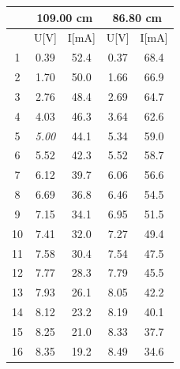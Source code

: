 \documentclass{article}
\begin{document}
{\begin{table}[H]
\centering
\begin{tabular}{@{}c|cc||cc@{}}
\toprule
\multirow{2}{*}{} & \multicolumn{2}{c||}{109.00 cm} & \multicolumn{2}{c}{86.80 cm}                \\ \midrule
                  & U[V]              & I[mA]     & U[V]                 & I[mA]                \\ \midrule
1                 & 0.39              & 52.4      & 0.37                 & 68.4                 \\
2                 & 1.70              & 50.0      & 1.66                 & 66.9                 \\
3                 & 2.76              & 48.4      & 2.69                 & 64.7                 \\
4                 & 4.03              & 46.3      & 3.64                 & 62.6                 \\
5                 & \textit{5.00}     & 44.1      & 5.34                 & 59.0                 \\
6                 & 5.52              & 42.3      & 5.52                 & 58.7                 \\
7                 & 6.12              & 39.7      & 6.06                 & 56.6                 \\
8                 & 6.69              & 36.8      & 6.46                 & 54.5                 \\
9                 & 7.15              & 34.1      & 6.95                 & 51.5                 \\
10                & 7.41              & 32.0      & 7.27                 & 49.4                 \\
11                & 7.58              & 30.4      & 7.54                 & 47.5                 \\
12                & 7.77              & 28.3      & 7.79                 & 45.5                 \\
13                & 7.93              & 26.1      & 8.05                 & 42.2                 \\
14                & 8.12              & 23.2      & 8.19                 & 40.1                 \\
15                & 8.25              & 21.0      & 8.33                 & 37.7                 \\
16                & 8.35              & 19.2      & 8.49                 & 34.6                 \\

\end{tabular}
\end{table}}
\end{document}
